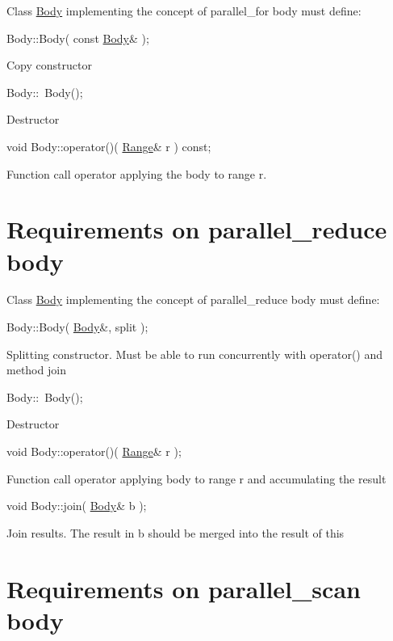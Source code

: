 Class {\ttfamily \hyperlink{classBody}{Body}} implementing the concept of parallel\+\_\+for body must define\+:
\begin{DoxyItemize}
\item 
\begin{DoxyCode}
Body::Body( \textcolor{keyword}{const} \hyperlink{classBody}{Body}& ); 
\end{DoxyCode}
 Copy constructor
\item 
\begin{DoxyCode}
Body::~Body(); 
\end{DoxyCode}
 Destructor
\item 
\begin{DoxyCode}
\textcolor{keywordtype}{void} Body::operator()( \hyperlink{classtbb_1_1blocked__range}{Range}& r ) \textcolor{keyword}{const}; 
\end{DoxyCode}
 Function call operator applying the body to range {\ttfamily r}. 
\end{DoxyItemize}\hypertarget{parallel_reduce_body_req}{}\section{Requirements on parallel\+\_\+reduce body}\label{parallel_reduce_body_req}
Class {\ttfamily \hyperlink{classBody}{Body}} implementing the concept of parallel\+\_\+reduce body must define\+:
\begin{DoxyItemize}
\item 
\begin{DoxyCode}
Body::Body( \hyperlink{classBody}{Body}&, split ); 
\end{DoxyCode}
 Splitting constructor. Must be able to run concurrently with operator() and method {\ttfamily join} 
\item 
\begin{DoxyCode}
Body::~Body(); 
\end{DoxyCode}
 Destructor
\item 
\begin{DoxyCode}
\textcolor{keywordtype}{void} Body::operator()( \hyperlink{classtbb_1_1blocked__range}{Range}& r ); 
\end{DoxyCode}
 Function call operator applying body to range {\ttfamily r} and accumulating the result
\item 
\begin{DoxyCode}
\textcolor{keywordtype}{void} Body::join( \hyperlink{classBody}{Body}& b ); 
\end{DoxyCode}
 Join results. The result in {\ttfamily b} should be merged into the result of {\ttfamily this} 
\end{DoxyItemize}\hypertarget{parallel_scan_body_req}{}\section{Requirements on parallel\+\_\+scan body}\label{parallel_scan_body_req}
